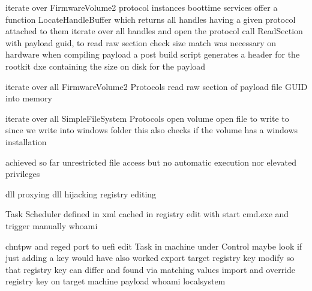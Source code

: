 iterate over FirmwareVolume2 protocol instances
boottime services offer a function LocateHandleBuffer which returns all handles having a given protocol attached to them
iterate over all handles and open the protocol
call ReadSection with payload guid, to read raw section
check size match was necessary on hardware
when compiling payload a post build script generates a header for the rootkit dxe containing the size on disk for the payload

iterate over all FirmwareVolume2 Protocols
read raw section of payload file GUID into memory

iterate over all SimpleFileSystem Protocols
open volume
open file to write to
since we write into windows folder this also checks if the volume has a windows installation

achieved so far unrestricted file access
but no automatic execution nor elevated privileges

dll proxying
dll hijacking
registry editing

Task Scheduler
defined in xml
cached in registry
edit with start cmd.exe and trigger manually
whoami

chntpw and reged
\cite{chntpw}
port to uefi
edit Task in machine under Control
maybe look if just adding a key would have also worked
export target registry key
modify so that registry key can differ and found via matching values
import and override registry key on target machine
payload whoami
localsystem

